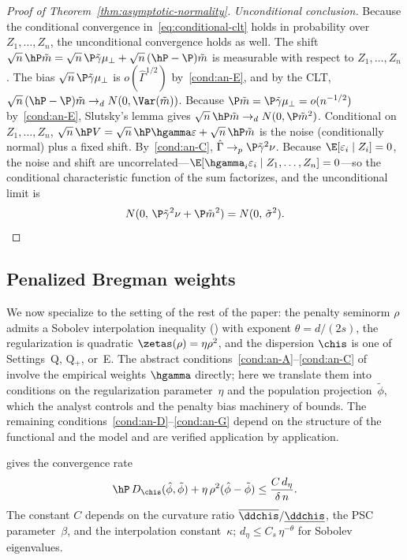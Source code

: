 \documentclass{article}
\begin{document}
\begin{proof}[Proof of Theorem~\ref{thm:asymptotic-normality}]
\textit{Unconditional conclusion.}
Because the conditional convergence
in~\eqref{eq:conditional-clt}
holds in probability over $Z_1, \ldots, Z_n$,
the unconditional convergence holds as well.
The shift
$\sqrt{n}\,\hP \tilde m
= \sqrt{n}\,\P\tilde\gamma\mu_\perp
+ \sqrt{n}\,(\hP - \P)\tilde m$
is measurable with respect to $Z_1, \ldots, Z_n$.
The bias $\sqrt{n}\,\P\tilde\gamma\mu_\perp$
is $o(\hat\Gamma^{1/2})$ by~\ref{cond:an-E},
and by the CLT,
$\sqrt{n}\,(\hP - \P)\tilde m
  \to_d N(0, \Var(\tilde m))$.
Because $\P\tilde m = \P\tilde\gamma\mu_\perp
  = o(n^{-1/2})$ by~\ref{cond:an-E},
Slutsky's lemma gives
$\sqrt{n}\,\hP\tilde m
  \to_d N(0, \P\tilde m^2)$.
Conditional on $Z_1, \ldots, Z_n$,
$\sqrt{n}\,\hP V
= \sqrt{n}\,\hP\hgamma\varepsilon
+ \sqrt{n}\,\hP \tilde m$
is the noise
(conditionally normal)
plus a fixed shift.
By~\ref{cond:an-C}, $\hat\Gamma \to_p \P\tilde\gamma^2\nu$.
Because
$\E[\varepsilon_i \mid Z_i] = 0$,
the noise and shift
are uncorrelated---$\E[\hgamma_i\varepsilon_i \mid Z_1, \ldots, Z_n] = 0$---so
the conditional characteristic function
of the sum factorizes,
and the unconditional limit is
\[
N(0,\, \P\tilde\gamma^2\nu + \P\tilde m^2)
= N(0,\, \tilde\sigma^2). \qedhere
\]
\end{proof}

\subsection{Penalized Bregman weights}
\label{subsec:penalized-bregman}

We now specialize to the setting
of the rest of the paper:
the penalty seminorm $\rho$
admits a Sobolev interpolation inequality
()
with exponent $\theta = d/(2s)$,
the regularization is quadratic
$\zetas(\rho) = \eta\rho^2$,
and the dispersion $\chis$
is one of Settings~Q, Q$_+$, or~E.
The abstract conditions~\ref{cond:an-A}--\ref{cond:an-C}
of 
involve the empirical weights $\hgamma$ directly;
here we translate them
into conditions on the regularization parameter~$\eta$
and the population projection~$\tilde\phi$,
which the analyst controls
and the penalty bias machinery
of  bounds.
The remaining conditions~\ref{cond:an-D}--\ref{cond:an-G}
depend on the structure
of the functional and the model
and are verified application by application.

gives the convergence rate
\[
\hP\, D_{\chis}(\hat\phi, \tilde\phi)
  + \eta\,\rho^2(\hat\phi - \tilde\phi)
  \le \frac{C\, d_\eta}{\delta\, n}.
\]
The constant $C$ depends on
the curvature ratio
$\overline{\ddchis}/\underline{\ddchis}$,
the PSC parameter~$\beta$,
and the interpolation constant~$\kappa$;
$d_\eta \le C_s\,\eta^{-\theta}$
for Sobolev eigenvalues.
\end{document}
